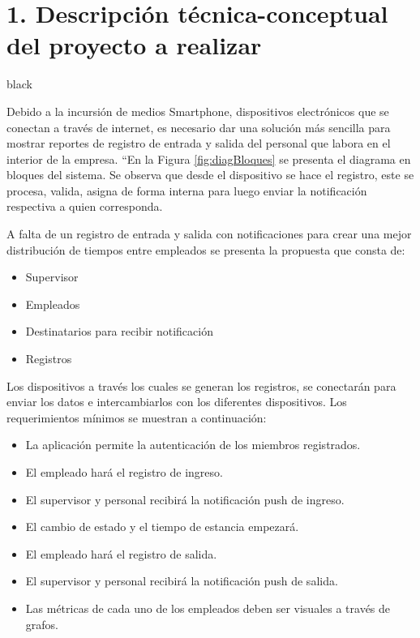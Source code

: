\documentclass[
11pt, %
]{charter}
\begin{document}
\section{1. Descripción técnica-conceptual del proyecto a realizar}
\label{sec:descripcion}


\begin{consigna}{black} %

Debido a la incursión de medios Smartphone, dispositivos electrónicos que se conectan a través de internet, es necesario dar una solución más sencilla para mostrar reportes de registro de entrada y salida del personal que labora en el interior de la empresa. ``En la Figura \ref{fig:diagBloques} se presenta el diagrama en bloques del sistema. Se observa que desde el dispositivo se hace el registro, este se procesa, valida, asigna de forma interna para luego enviar la notificación respectiva a quien corresponda.

A falta de un registro de entrada y salida con notificaciones para crear una mejor distribución de tiempos entre empleados se presenta la propuesta que consta de:

\begin{itemize}
	\item Supervisor
	\item Empleados
	\item Destinatarios para recibir notificación
	\item Registros
\end{itemize}

Los dispositivos a través los cuales se generan los registros, se conectarán para enviar los datos e intercambiarlos con los diferentes dispositivos. Los requerimientos mínimos se muestran a continuación:

\begin{itemize}
	\item La aplicación permite la autenticación de los miembros registrados.
	\item El empleado hará el registro de ingreso.
	\item El supervisor y personal recibirá la notificación push de ingreso.
	\item El cambio de estado y el tiempo de estancia empezará.
	\item El empleado hará el registro de salida.
	\item El supervisor y personal recibirá la notificación push de salida.
	\item Las métricas de cada uno de los empleados deben ser visuales a través de grafos.
\end{itemize}


\end{consigna}
\end{document}
